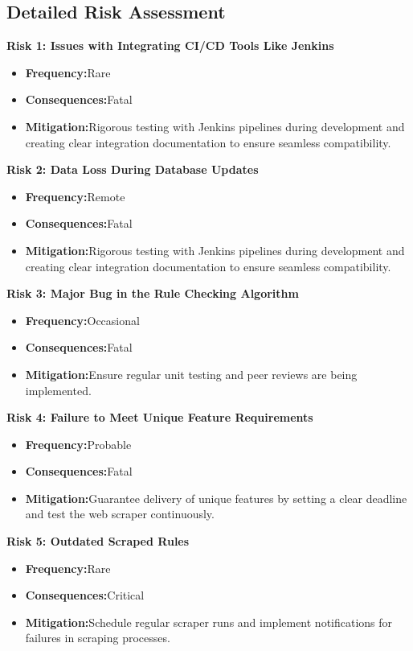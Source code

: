 \subsection{Detailed Risk Assessment}
\textbf{Risk 1: Issues with Integrating CI/CD Tools Like Jenkins}
\begin{itemize}
    \item \textbf{Frequency:}Rare 
    \item \textbf{Consequences:}Fatal 
    \item \textbf{Mitigation:}Rigorous testing with Jenkins pipelines during development and creating clear integration                       documentation to ensure seamless compatibility. 
\end{itemize}
\textbf{Risk 2: Data Loss During Database Updates }
\begin{itemize}
    \item \textbf{Frequency:}Remote 
    \item \textbf{Consequences:}Fatal 
    \item \textbf{Mitigation:}Rigorous testing with Jenkins pipelines during development and creating clear integration documentation to ensure seamless compatibility. 
\end{itemize}
\textbf{Risk 3: Major Bug in the Rule Checking Algorithm }
\begin{itemize}
    \item \textbf{Frequency:}Occasional 
    \item \textbf{Consequences:}Fatal 
    \item \textbf{Mitigation:}Ensure regular unit testing and peer reviews are being implemented.
\end{itemize}
\textbf{Risk 4: Failure to Meet Unique Feature Requirements }
\begin{itemize}
    \item \textbf{Frequency:}Probable
    \item \textbf{Consequences:}Fatal 
    \item \textbf{Mitigation:}Guarantee delivery of unique features by setting a clear deadline and test the web scraper continuously. 
\end{itemize}
\textbf{Risk 5: Outdated Scraped Rules }
\begin{itemize}
    \item \textbf{Frequency:}Rare 
    \item \textbf{Consequences:}Critical 
    \item \textbf{Mitigation:}Schedule regular scraper runs and implement notifications for failures in scraping processes. 
\end{itemize}
